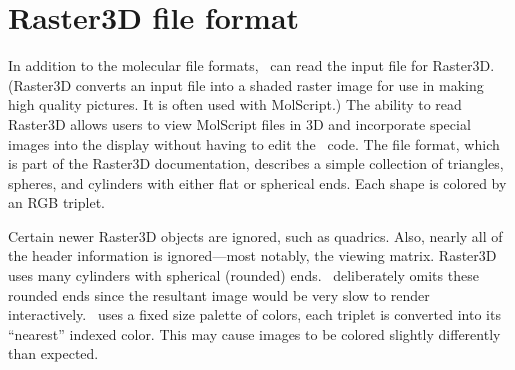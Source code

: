\section{Raster3D file format}

In addition to the molecular file formats, \VMD\ can read the input
file for Raster3D.  (Raster3D converts an input file
into a shaded raster image for use in making high quality pictures.
It is often used with MolScript.)  The ability to read Raster3D allows
users to view MolScript files in 3D and incorporate special images
into the display without having to edit the \VMD\ code.  
The file format, which is part of the Raster3D documentation,
describes a simple collection of triangles, spheres, and cylinders
with either flat or spherical ends.  Each shape is colored by an RGB
triplet.

Certain newer Raster3D objects are ignored, such as quadrics. Also,
nearly all of the header information is ignored---most notably, the
viewing matrix.  Raster3D uses many cylinders with spherical
(rounded) ends. \VMD\ deliberately omits these rounded ends since the
resultant image would be very slow to render interactively.
\VMD\ uses a fixed size palette of colors, each triplet is
converted into its ``nearest'' indexed color.  This may cause images
to be colored slightly differently than expected.

